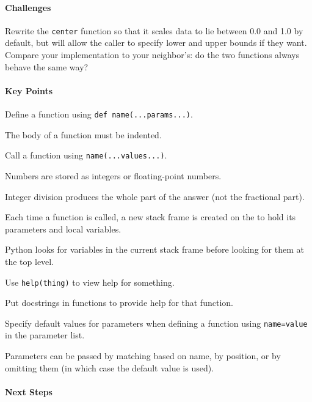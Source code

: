 \documentclass{book}
\begin{document}
\mbox{}\paragraph{Challenges}

\begin{swcenumerate}
\item
  Rewrite the \texttt{center} function so that it scales data to lie
  between 0.0 and 1.0 by default, but will allow the caller to specify
  lower and upper bounds if they want. Compare your implementation to
  your neighbor's: do the two functions always behave the same way?
\end{swcenumerate}

\mbox{}\paragraph{Key Points}

\begin{swcitemize}
\item
  Define a function using \texttt{def name(...params...)}.
\item
  The body of a function must be indented.
\item
  Call a function using \texttt{name(...values...)}.
\item
  Numbers are stored as integers or floating-point numbers.
\item
  Integer division produces the whole part of the answer (not the
  fractional part).
\item
  Each time a function is called, a new stack frame is created on the
   to hold its parameters and local
  variables.
\item
  Python looks for variables in the current stack frame before looking
  for them at the top level.
\item
  Use \texttt{help(thing)} to view help for something.
\item
  Put docstrings in functions to provide help for that function.
\item
  Specify default values for parameters when defining a function using
  \texttt{name=value} in the parameter list.
\item
  Parameters can be passed by matching based on name, by position, or by
  omitting them (in which case the default value is used).
\end{swcitemize}

\mbox{}\paragraph{Next Steps}
\end{document}
